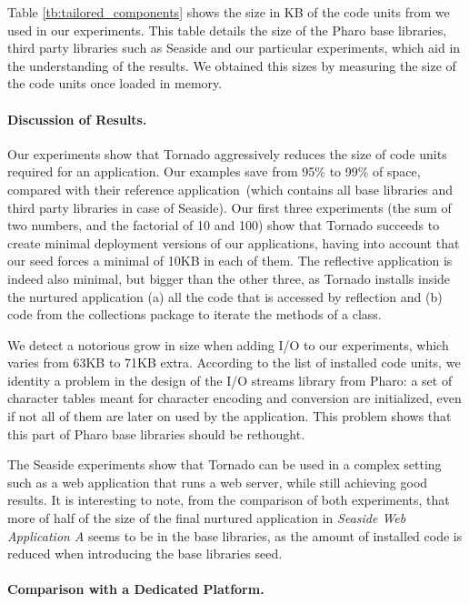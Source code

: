Table \ref{tb:tailored_components} shows the size in KB of the code units from we used in our experiments. This table details the size of the Pharo base libraries, third party libraries such as Seaside and our particular experiments, which aid in the understanding of the results. We obtained this sizes by measuring the size of the code units once loaded in memory.

\paragraph{Discussion of Results.}
Our experiments show that Tornado aggressively reduces the size of code units required for an application. Our examples save from 95\% to 99\% of space, compared with their reference application~(which contains all base libraries and third party libraries in case of Seaside). Our first three experiments (the sum of two numbers, and the factorial of 10 and 100) show that Tornado succeeds to create minimal deployment versions of our applications, having into account that our seed forces a minimal of 10KB in each of them. The reflective application is indeed also minimal, but bigger than the other three, as Tornado installs inside the nurtured application (a) all the code that is accessed by reflection and (b) code from the collections package to iterate the methods of a class.

We detect a notorious grow in size when adding I/O to our experiments, which varies from 63KB to 71KB extra. According to the list of installed code units, we identity a problem in the design of the I/O streams library from Pharo: a set of character tables meant for character encoding and conversion are initialized, even if not all of them are later on used by the application. This problem shows that this part of Pharo base libraries should be rethought.

The Seaside experiments show that Tornado can be used in a complex setting such as a web application that runs a web server, while still achieving good results. It is interesting to note, from the comparison of both experiments, that more of half of the size of the final nurtured application in \emph{Seaside Web Application A} seems to be in the base libraries, as the amount of installed code is reduced when introducing the base libraries seed.

\paragraph{Comparison with a Dedicated Platform.}

